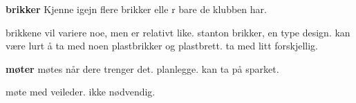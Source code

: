\textbf{brikker}
Kjenne igejn flere brikker elle r bare de klubben har.

brikkene vil variere noe, men er relativt like. stanton brikker, en type design. kan være lurt å ta med noen plastbrikker og plastbrett. ta med litt forskjellig. 

\textbf{møter}
møtes når dere trenger det. planlegge. kan ta på sparket.

møte med veileder. ikke nødvendig. 
